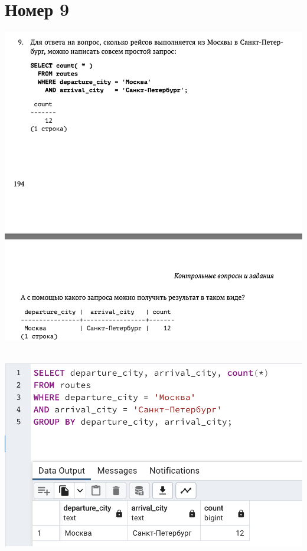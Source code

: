 \documentclass[a4paper,12pt]{article}
\begin{document}
\section*{Номер 9}
\includegraphics[scale=0.6]{t9.png}
\\\\
\begin{center}
\includegraphics[scale=0.5]{91.png}
\end{center}
\clearpage
\end{document}
